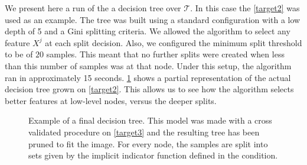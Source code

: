 We present here a run of the a decision tree over $\mathcal{T}$.
In this case the \cref{target2} was used as an example.
The tree was built using a standard configuration with a low depth of 5 and a Gini splitting criteria.
We allowed the algorithm to select any feature $X^j$ at each split decision. 
Also, we configured the minimum split threshold to be of $20$ samples.
This meant that no further splits were created when less than this number of samples was at that node.
Under this setup, the algorithm ran in approximately 15 seconds.
\cref{fig:decision_tree_actual_problem} shows a partial representation of the actual decision tree grown on \cref{target2}.
This allows us to see how the algorithm selects better features at low-level nodes, versus the deeper splits.

\bigskip

\begin{figure}
	\centering
	\caption{ Example of a final decision tree.
		This model was made with a cross validated procedure on \cref{target3} and the resulting tree has been pruned to fit the image.
		For every node, the samples are split into sets given by the implicit indicator function defined in the condition.}
	\label{fig:decision_tree_actual_problem}
\end{figure}




